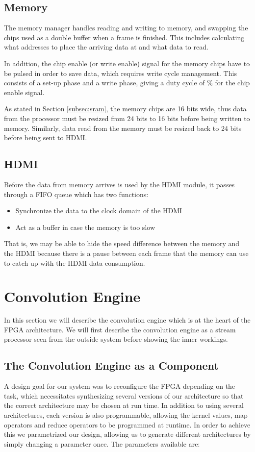 \subsection{Memory}
The memory manager handles reading and writing to memory, and swapping the chips used as a double buffer when a frame is finished.
This includes calculating what addresses to place the arriving data at and what data to read.

In addition, the chip enable (or write enable) signal for the memory chips have to be pulsed in order to save data, which requires write cycle management.
This consists of a set-up phase and a write phase, giving a duty cycle of \unit[50]{\%} for the chip enable signal.

As stated in Section \ref{subsec:sram}, the memory chips are 16 bits wide, thus data from the processor must be resized from 24 bits to 16 bits before being written to memory.
Similarly, data read from the memory must be resized back to 24 bits before being sent to HDMI.

\subsection{HDMI}
Before the data from memory arrives is used by the HDMI module, it passes through a FIFO queue which has two functions:
\begin{itemize}
    \item Synchronize the data to the clock domain of the HDMI
    \item Act as a buffer in case the memory is too slow
\end{itemize}

That is, we may be able to hide the speed difference between the memory and the HDMI because there is a pause between each frame that the memory can use to catch up with the HDMI data consumption.

\section{Convolution Engine}
\label{sec:processor}
In this section we will describe the convolution engine which is at the heart of the FPGA architecture.
We will first describe the convolution engine as a stream processor seen from the outside system before showing the inner workings.

\subsection{The Convolution Engine as a Component}
A design goal for our system was to reconfigure the FPGA depending on the task, which necessitates synthesizing several versions of our architecture so that the correct architecture may be chosen at run time.
In addition to using several architectures, each version is also programmable, allowing the kernel values, map operators and reduce operators to be programmed at runtime.
In order to achieve this we parametrized our design, allowing us to generate different architectures by simply changing a parameter once.
The parameters available are:

